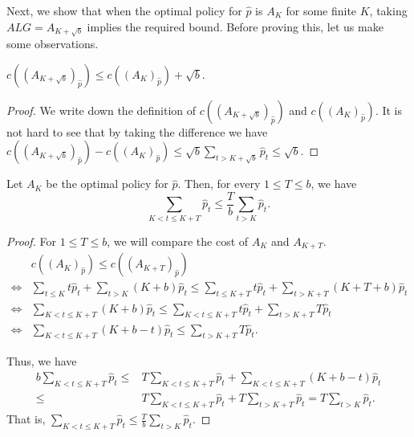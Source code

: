 Next, we show that when the optimal policy for $\hat{p}$ is $A_K$ for some finite $K$, taking $ALG=A_{K+\sqrt{b}}$ implies the required bound. Before proving this, let us make some observations.

\begin{observation}
    \label{obs:AK plus root b is not too bad than AK}
    $c((A_{K+\sqrt{b}})_{\hat{p}}) \leq c((A_{K})_{\hat{p}}) + \sqrt{b}$.
\end{observation}

\begin{proof}
    We write down the definition of $c((A_{K+\sqrt{b}})_{\hat{p}})$ and $c((A_{K})_{\hat{p}})$. It is not hard to see that by taking the difference we have $c((A_{K+\sqrt{b}})_{\hat{p}}) - c((A_{K})_{\hat{p}}) \leq \sqrt{b} \sum_{t>K+\sqrt{b}}\hat{p}_t \leq \sqrt{b}$.
\end{proof}

\begin{claim}
    \label{claim:if AK is opt policy then K to K+T cannot have too much mass}
    Let $A_K$ be the optimal policy for $\hat{p}$. Then, for every $1 \leq T \leq b$, we have
    \[\sum_{K<t\leq K+T}\hat{p}_t \leq \frac{T}{b}\sum_{t>K}\hat{p}_t.\]
\end{claim}

\begin{proof}
    For $1 \leq T \leq b$, we will compare the cost of $A_K$ and $A_{K+T}$.
    \begin{align*}
    & c((A_K)_{\hat{p}}) \leq c((A_{K+T})_{\hat{p}}) \\
    \iff & \sum_{t \leq K} t\hat{p}_t + \sum_{t>K}(K+b)\hat{p}_t \leq \sum_{t \leq K+T} t\hat{p}_t + \sum_{t>K+T}(K+T+b)\hat{p}_t \\
    \iff & \sum_{K<t \leq K+T}(K+b)\hat{p}_t \leq \sum_{K<t \leq K+T} t\hat{p}_t + \sum_{t> K+T}T\hat{p}_t \\
    \iff & \sum_{K<t \leq K+T}(K+b-t)\hat{p}_t \leq  \sum_{t> K+T}T\hat{p}_t.
    \end{align*}
    
    Thus, we have 
    \begin{align*}
    b \sum_{K<t\leq K+T}\hat{p}_t \leq&  T \sum_{K<t \leq K+T} \hat{p}_t + \sum_{K<t \leq K+T}(K+b-t)\hat{p}_t\\
    \leq& T \sum_{K<t \leq K+T} \hat{p}_t + T \sum_{t> K+T} \hat{p}_t=T \sum_{t>K}\hat{p}_t.
    \end{align*}
    That is, $\sum_{K<t\leq K+T}\hat{p}_t \leq \frac{T}{b}\sum_{t>K}\hat{p}_t$.
\end{proof}

